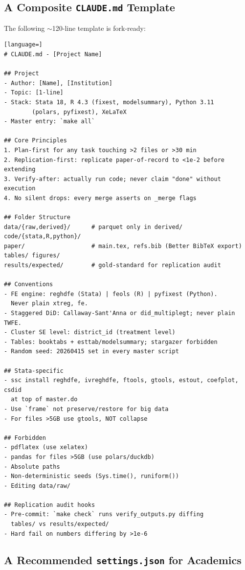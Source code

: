 \documentclass[11pt]{article}
\begin{document}
\subsection{A Composite \texttt{CLAUDE.md} Template}

The following $\sim$120-line template is fork-ready:

\begin{lstlisting}[language=]
# CLAUDE.md - [Project Name]

## Project
- Author: [Name], [Institution]
- Topic: [1-line]
- Stack: Stata 18, R 4.3 (fixest, modelsummary), Python 3.11
        (polars, pyfixest), XeLaTeX
- Master entry: `make all`

## Core Principles
1. Plan-first for any task touching >2 files or >30 min
2. Replication-first: replicate paper-of-record to <1e-2 before extending
3. Verify-after: actually run code; never claim "done" without execution
4. No silent drops: every merge asserts on _merge flags

## Folder Structure
data/{raw,derived}/      # parquet only in derived/
code/{stata,R,python}/
paper/                   # main.tex, refs.bib (Better BibTeX export)
tables/ figures/
results/expected/        # gold-standard for replication audit

## Conventions
- FE engine: reghdfe (Stata) | feols (R) | pyfixest (Python).
  Never plain xtreg, fe.
- Staggered DiD: Callaway-Sant'Anna or did_multiplegt; never plain TWFE.
- Cluster SE level: district_id (treatment level)
- Tables: booktabs + esttab/modelsummary; stargazer forbidden
- Random seed: 20260415 set in every master script

## Stata-specific
- ssc install reghdfe, ivreghdfe, ftools, gtools, estout, coefplot, csdid
  at top of master.do
- Use `frame` not preserve/restore for big data
- For files >5GB use gtools, NOT collapse

## Forbidden
- pdflatex (use xelatex)
- pandas for files >5GB (use polars/duckdb)
- Absolute paths
- Non-deterministic seeds (Sys.time(), runiform())
- Editing data/raw/

## Replication audit hooks
- Pre-commit: `make check` runs verify_outputs.py diffing
  tables/ vs results/expected/
- Hard fail on numbers differing by >1e-6
\end{lstlisting}

\subsection{A Recommended \texttt{settings.json} for Academics}
\end{document}

